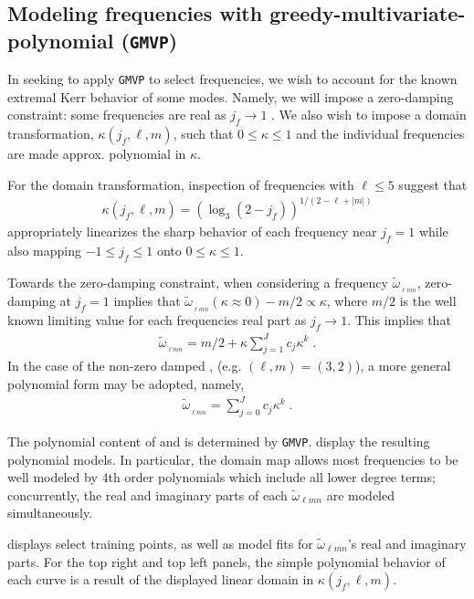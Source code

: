 \documentclass[twocolumn,aps,prd,floatfix,preprintnumbers,a4paper,nofootinbib,
superscriptaddress,10pt]{revtex4-1}
\newcommand{\cw}{\tilde{\omega}}
\def\jf{j_f}
\def\lmn{_{\ell m n}}
\def\gmvp#1{greedy-multivariate-polynomial#1
  (\texttt{GMVP}#1)\gdef\gmvp{\texttt{GMVP}}}
\begin{document}
\subsection{Modeling \qnm{} frequencies with \gmvp{}}
%
%
%
In seeking to apply \gmvp{} to select \qnm{} frequencies, we wish to account for the known extremal Kerr behavior of some modes.
%
Namely, we will impose a zero-damping constraint: some frequencies are real as $\jf \rightarrow 1$ \cite{Zimmerman:2015trm}.
%
We also wish to impose a domain transformation, $\kappa(\jf,\ell,m)$, such that $0 \leq \kappa \leq 1$ and the individual \qnm{} frequencies are made approx. polynomial in $\kappa$.
%
\par For the domain transformation, inspection of \qnm{} frequencies with $\ell \leq 5$ suggest that
%
\begin{align}
  \label{eq:kappa}
  \kappa(\jf,\ell,m) = \left( \log_3( 2 - \jf ) \right)^{1/(2-\ell+|m|)}
\end{align}
%
appropriately linearizes the sharp behavior of each frequency near $\jf=1$ while also mapping $-1 \le \jf \le 1$ onto $0 \le \kappa \le 1$.
%
\par Towards the zero-damping constraint, when considering a \qnm{} frequency $\cw_{\lmn}$, zero-damping at $\jf=1$ implies that $\cw_{\lmn}(\kappa \approx 0)-m/2 \propto \kappa$, where $m/2$ is the well known limiting value for each \qnm{} frequencies real part as $\jf\rightarrow 1$.
%
This implies that
%
\begin{align}
  \label{eq:zd}
  \cw_{\lmn} = m/2 + \kappa \sum_{j=1}^{J} c_j \kappa^k \; .
\end{align}
%
In the case of the non-zero damped , (e.g. $(\ell,m)=(3,2)$), a more general polynomial form may be adopted, namely,
%
\begin{align}
  \label{eq:nzd}
  \cw_{\lmn} = \sum_{j=0}^{J} c_j \kappa^k \; .
\end{align}
%
\par The polynomial content of  and  is determined by \gmvp{}.
%
 display the resulting polynomial models.
%
In particular, the domain map allows most \qnm{} frequencies to be well modeled by 4th order polynomials which include all lower degree terms; concurrently, the real and imaginary parts of each $\cw\lmn$ are modeled simultaneously.
%
\par {} displays select training points, as well as model fits for $\cw\lmn$'s real and imaginary parts.
%
For the top right and top left panels, the simple polynomial behavior of each curve is a result of the displayed linear domain in $\kappa(\jf,\ell,m)$.
\end{document}

